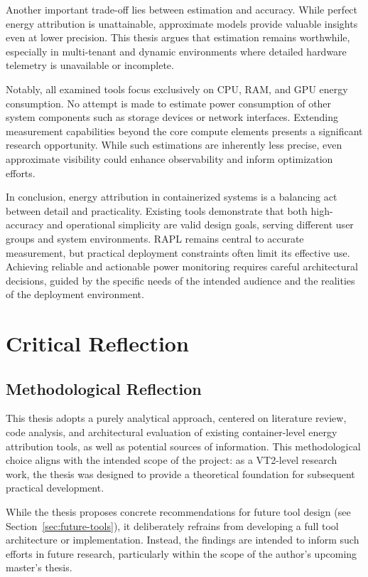 Another important trade-off lies between estimation and accuracy. While perfect energy attribution is unattainable, approximate models provide valuable insights even at lower precision. This thesis argues that estimation remains worthwhile, especially in multi-tenant and dynamic environments where detailed hardware telemetry is unavailable or incomplete.

Notably, all examined tools focus exclusively on CPU, RAM, and GPU energy consumption. No attempt is made to estimate power consumption of other system components such as storage devices or network interfaces. Extending measurement capabilities beyond the core compute elements presents a significant research opportunity. While such estimations are inherently less precise, even approximate visibility could enhance observability and inform optimization efforts.

In conclusion, energy attribution in containerized systems is a balancing act between detail and practicality. Existing tools demonstrate that both high-accuracy and operational simplicity are valid design goals, serving different user groups and system environments. RAPL remains central to accurate measurement, but practical deployment constraints often limit its effective use. Achieving reliable and actionable power monitoring requires careful architectural decisions, guided by the specific needs of the intended audience and the realities of the deployment environment.

\section{Critical Reflection}

\subsection{Methodological Reflection}

This thesis adopts a purely analytical approach, centered on literature review, code analysis, and architectural evaluation of existing container-level energy attribution tools, as well as potential sources of information. This methodological choice aligns with the intended scope of the project: as a VT2-level research work, the thesis was designed to provide a theoretical foundation for subsequent practical development.

While the thesis proposes concrete recommendations for future tool design (see Section~\ref{sec:future-tools}), it deliberately refrains from developing a full tool architecture or implementation. Instead, the findings are intended to inform such efforts in future research, particularly within the scope of the author’s upcoming master's thesis.

